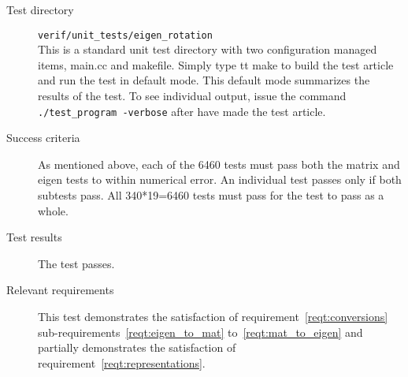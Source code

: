 \begin{description}
\item[Test directory] {\tt verif/unit\_tests/eigen\_rotation} \\
This is a standard unit test directory with two configuration managed items,
main.cc and makefile. Simply type {tt make} to build the test article and run the
test in default mode. This default mode summarizes the results of the test.
To see individual output, issue the command {\tt ./test\_program -verbose} after
have made the test article.

\item[Success criteria]
As mentioned above, each of the 6460 tests must pass both the matrix and
eigen tests to within numerical error. An individual test passes only if both
subtests pass. All 340*19=6460 tests must pass for the test to pass as a whole.

\item[Test results]
The test passes.

\item[Relevant requirements]
This test demonstrates the satisfaction of requirement~\ref{reqt:conversions}
sub-requirements~\ref{reqt:eigen_to_mat} to~\ref{reqt:mat_to_eigen}
and partially demonstrates the satisfaction of
requirement~\ref{reqt:representations}.

\end{description}
